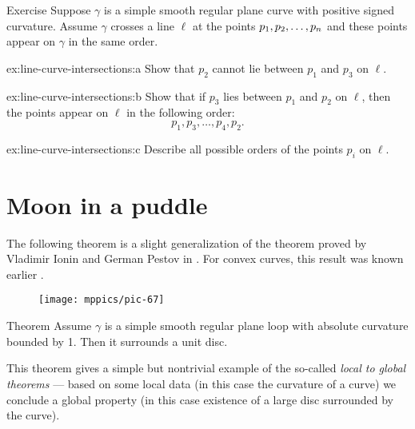 \begin{thm}{Exercise}\label{ex:line-curve-intersections}
Suppose $\gamma$ is a simple smooth regular plane curve with positive signed curvature.
Assume $\gamma$ crosses a line $\ell$ at the points $p_1,p_2,\z\dots, p_n$ and these points appear on $\gamma$ in the same order.

\begin{subthm}{ex:line-curve-intersections:a} Show that $p_2$ cannot lie between $p_1$ and $p_3$ on $\ell$.
\end{subthm}

\begin{subthm}{ex:line-curve-intersections:b} Show that if $p_3$ lies between $p_1$ and $p_2$ on $\ell$, then the points appear on $\ell$ in the following order:  
\[p_1,p_3,\dots,p_4 ,p_2.\]

\end{subthm}

\begin{subthm}{ex:line-curve-intersections:c}
Describe all possible orders of the points $p_i$ on $\ell$.

\end{subthm}

\end{thm}

\section{Moon in a puddle}

The following theorem is a slight generalization of the theorem proved by Vladimir Ionin and German Pestov in \cite{ionin-pestov}.
For convex curves, this result was known earlier \cite[\S 24]{blaschke}.


\begin{wrapfigure}{r}{18 mm}
\vskip-6mm
\centering
\texttt{[image: mppics/pic-67]}
\vskip0mm
\end{wrapfigure}

\begin{thm}{Theorem}\label{thm:moon-orginal}
Assume $\gamma$ is a simple smooth regular plane loop with absolute curvature bounded by 1.
Then it surrounds a unit disc.
\end{thm}

This theorem gives a simple but nontrivial example of the so-called \emph{local to global theorems} --- based on some local data (in this case the curvature of a curve) we conclude a global property (in this case existence of a large disc surrounded by the curve).

